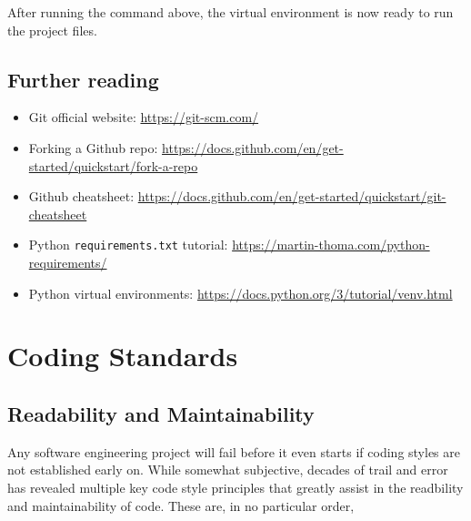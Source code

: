 \documentclass[11pt]{article}
\begin{document}
\noindent
After running the command above, the virtual environment is now ready to run the project files.

\subsection{Further reading}

\begin{itemize}
    \item Git official website: \url{https://git-scm.com/}
    \item Forking a Github repo: \url{https://docs.github.com/en/get-started/quickstart/fork-a-repo}
    \item Github cheatsheet: \url{https://docs.github.com/en/get-started/quickstart/git-cheatsheet}
    \item Python \texttt{requirements.txt} tutorial: \url{https://martin-thoma.com/python-requirements/}
    \item Python virtual environments: \url{https://docs.python.org/3/tutorial/venv.html}
\end{itemize}

\newpage

\section{Coding Standards}

\subsection{Readability and Maintainability}

Any software engineering project will fail before it even starts if coding styles are not established early on. While somewhat subjective, decades of trail and error has revealed multiple key code style principles that greatly assist in the readbility and maintainability of code. These are, in no particular order,
\end{document}
